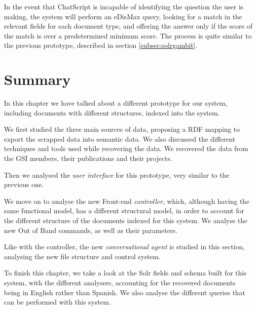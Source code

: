 In the event that ChatScript is incapable of identifying the question the user is making, the system will perform an \ac{eDisMax} query, looking for a match in the relevant fields for each document type, and offering the answer only if the score of the match is over a predetermined minimum score. The process is quite similar to the previous prototype, described in section \ref{subsec:solrgambit}.


\section{Summary}

In this chapter we have talked about a different prototype for our system, including documents with different structures, indexed into the system.

We first studied the three main sources of data, proposing a \ac{RDF} mapping to export the scrapped data into semantic data. We also discussed the different techniques and tools used while recovering the data. We recovered the data from the GSI members, their publications and their projects.

Then we analysed the \emph{user interface} for this prototype, very similar to the previous one.

We move on to analyse the new Front-end \emph{controller}, which, although having the same functional model, has a different structural model, in order to account for the different structure of the documents indexed for this system. We analyse the new Out of Band commands, as well as their parameters.

Like with the controller, the new \emph{conversational agent} is studied in this section, analysing the new file structure and control system.

To finish this chapter, we take a look at the Solr fields and schema built for this system, with the different analysers, accounting for the recovered documents being in English rather than Spanish. We also analyse the different queries that can be performed with this system.